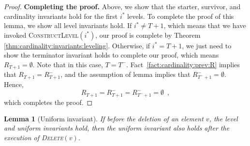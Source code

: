 \documentclass[11pt]{article}
\newtheorem{lemma}[theorem]{Lemma}
\newcommand{\constLevel}{\textsc{ConstructLevel}}
\newcommand{\deletev}{{\textsc{Delete}}}
\begin{document}
\begin{proof}
\textbf{Completing the proof. }
Above, we show that the starter, survivor, and cardinality invariants hold for the first $i^*$ levels.
To complete the proof of this lemma, we show all level invariants hold.
If $i^* \ne T + 1$, which means that we have invoked \constLevel$(i^*)$, our proof is complete by Theorem \ref{thm:cardinality:invariants:leveling}. 
Otherwise, if $i^* = T + 1$, we just need to show the terminator invariant holds to complete our proof, which means $R_{T + 1} = \emptyset$. 
Note that in this case, $T=T^-$.
Fact~\ref{fact:cardinality:prev:R} implies that $R_{T + 1}=R_{T + 1}^-$, and the assumption of lemma implies that $R_{T^- + 1}^- = \emptyset$.
Hence,
$$
R_{T + 1} = R_{T + 1}^- = R_{T^- + 1}^- = \emptyset \enspace,
$$
which completes the proof.
\end{proof}





\begin{lemma} [Uniform invariant]
\label{cardinality:mat_delete_uni}
If before the deletion of an element $v$, the level and uniform invariants hold, then the uniform invariant also holds after the execution of \deletev$(v)$. 
\end{lemma}
\end{document}
